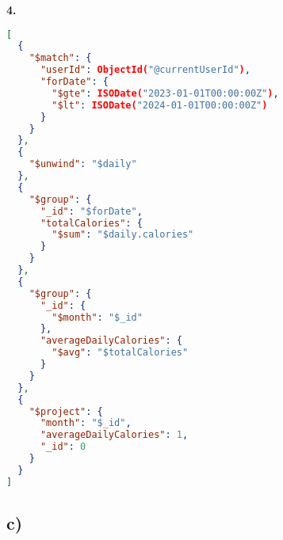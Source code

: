\documentclass{article}
\begin{document}
\pagebreak
\hspace{0cm}\textbf{4.}
\begin{lstlisting}[language=json]
[
  {
    "$match": {
      "userId": ObjectId("@currentUserId"),
      "forDate": {
        "$gte": ISODate("2023-01-01T00:00:00Z"),
        "$lt": ISODate("2024-01-01T00:00:00Z")
      }
    }
  },
  {
    "$unwind": "$daily"
  },
  {
    "$group": {
      "_id": "$forDate",
      "totalCalories": {
        "$sum": "$daily.calories"
      }
    }
  },
  {
    "$group": {
      "_id": {
        "$month": "$_id"
      },
      "averageDailyCalories": {
        "$avg": "$totalCalories"
      }
    }
  },
  {
    "$project": {
      "month": "$_id",
      "averageDailyCalories": 1,
      "_id": 0
    }
  }
]
\end{lstlisting}

\pagebreak

\subsection*{\small c)}
\end{document}
